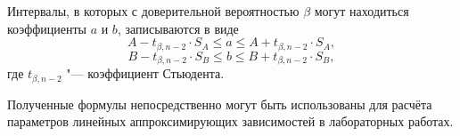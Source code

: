 \documentclass[a4paper, 12pt]{extarticle}
\begin{document}
Интервалы, в которых с доверительной вероятностью $\beta$ могут находиться коэффициенты $a$ и $b$, записываются в виде
\begin{equation}
\label{eq:m11-range-1}
A - t_{\beta, n - 2} \cdot S_A \le a \le A + t_{\beta, n - 2} \cdot S_A,
\end{equation}
\begin{equation}
\label{eq:m11-range-2}
B - t_{\beta, n - 2} \cdot S_B \le b \le B + t_{\beta, n - 2} \cdot S_B,
\end{equation}
где $t_{\beta, n-2}$ "--- коэффициент Стьюдента.

Полученные формулы непосредственно могут быть использованы для расчёта параметров линейных аппроксимирующих зависимостей в лабораторных работах.
\end{document}

